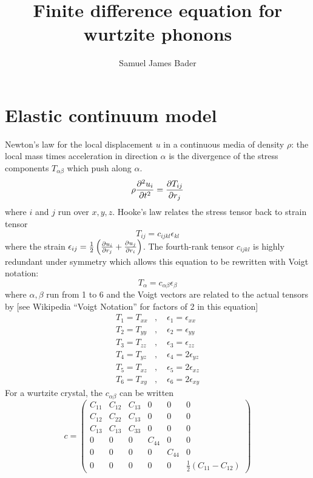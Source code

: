 \documentclass{article}
\begin{document}
\title{Finite difference equation for wurtzite phonons}
\author{Samuel James Bader}
\maketitle

\section{Elastic continuum model}
Newton's law for the local displacement $u$ in a continuous media of density $\rho$: the local mass times acceleration in direction $\alpha$ is the divergence of the stress components $T_{\alpha \beta}$ which push along $\alpha$.
\begin{equation}
  \rho \pdv[2]{u_i}{t}=\pdv{T_{ij}}{r_j}
  \label{eq:ecmnewton}
\end{equation}
where $i$ and $j$ run over $x, y, z$.  Hooke's law relates the stress tensor back to strain tensor
\begin{equation}
  T_{ij}=c_{ijkl}\epsilon_{kl}
\end{equation}
where the strain $\epsilon_{ij}=\frac{1}{2}\left( \pdv{u_i}{r_j}+\pdv{u_j}{r_i} \right)$.  The fourth-rank tensor $c_{ijkl}$ is highly redundant under symmetry which allows this equation to be rewritten with Voigt notation:
\begin{equation}
  T_{\alpha}=c_{\alpha \beta}\epsilon_\beta
\end{equation}
where $\alpha, \beta$ run from 1 to 6 and the Voigt vectors are related to the actual tensors by [see Wikipedia ``Voigt Notation'' for factors of 2 in this equation]
\begin{align}
  T_{1}=T_{xx}&,\quad
  \epsilon_{1}=\epsilon_{xx}\\
  T_{2}=T_{yy}&,\quad
  \epsilon_{2}=\epsilon_{yy}\\
  T_{3}=T_{zz}&,\quad
  \epsilon_{3}=\epsilon_{zz}\\
  T_{4}=T_{yz}&,\quad
  \epsilon_{4}=2\epsilon_{yz}\\
  T_{5}=T_{xz}&,\quad
  \epsilon_{5}=2\epsilon_{xz}\\
  T_{6}=T_{xy}&,\quad
  \epsilon_{6}=2\epsilon_{xy}
\end{align}
For a wurtzite crystal, the $c_{\alpha \beta}$ can be written
\begin{equation}
  c=\begin{pmatrix}
    C_{11} & C_{12} & C_{13} &      0 &      0 & 0 \\
    C_{12} & C_{22} & C_{13} &      0 &      0 & 0 \\
    C_{13} & C_{13} & C_{33} &      0 &      0 & 0 \\
    0      &      0 &      0 & C_{44} &      0 & 0 \\
    0      &      0 &      0 &      0 & C_{44} & 0 \\
    0      &      0 &      0 &      0 &      0 & \frac{1}{2}\left(C_{11}-C_{12}  \right)  \end{pmatrix}
\end{equation}
\end{document}
